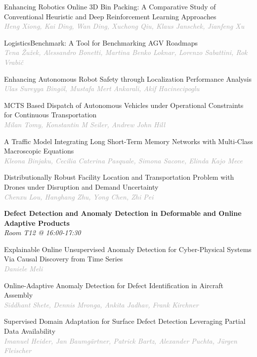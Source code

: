 \begin{multicols*}{2}
\small Enhancing Robotics Online 3D Bin Packing: A Comparative Study of Conventional Heuristic and Deep Reinforcement Learning Approaches\\ 
\footnotesize \textcolor{darkgray}{\textit{Heng Xiong, Kai  Ding, Wan  Ding, Xuchong  Qiu, Klaus  Janschek, Jianfeng  Xu}}

\small LogisticsBenchmark: A Tool for Benchmarking AGV Roadmaps\\ 
\footnotesize \textcolor{darkgray}{\textit{Tena Žužek, Alessandro  Bonetti, Martina  Benko Loknar, Lorenzo  Sabattini, Rok Vrabič}}

\small Enhancing Autonomous Robot Safety through Localization Performance Analysis\\ 
\footnotesize \textcolor{darkgray}{\textit{Ulas Sureyya Bingöl, Mustafa Mert  Ankarali, Akif  Hacinecipoglu}}

\small MCTS Based Dispatch of Autonomous Vehicles under Operational Constraints for Continuous Transportation\\ 
\footnotesize \textcolor{darkgray}{\textit{Milan Tomy, Konstantin M  Seiler, Andrew John  Hill}}

\small A Traffic Model Integrating Long Short-Term Memory Networks with Multi-Class Macroscopic Equations\\ 
\footnotesize \textcolor{darkgray}{\textit{Kleona Binjaku, Cecilia Caterina  Pasquale, Simona  Sacone, Elinda  Kajo Mece}}

\small Distributionally Robust Facility Location and Transportation Problem with Drones under Disruption and Demand Uncertainty\\ 
\footnotesize \textcolor{darkgray}{\textit{Chenxu Lou, Hanghang  Zhu, Yong  Chen, Zhi  Pei}}

\normalsize \textbf{Defect Detection and Anomaly Detection in Deformable and Online Adaptive Products}\\
\small \textit{Room T12 @ 16:00-17:30}

\small Explainable Online Unsupervised Anomaly Detection for Cyber-Physical Systems Via Causal Discovery from Time Series\\ 
\footnotesize \textcolor{darkgray}{\textit{Daniele Meli}}

\small Online-Adaptive Anomaly Detection for Defect Identification in Aircraft Assembly\\ 
\footnotesize \textcolor{darkgray}{\textit{Siddhant Shete, Dennis  Mronga, Ankita  Jadhav, Frank  Kirchner}}

\small Supervised Domain Adaptation for Surface Defect Detection Leveraging Partial Data Availability\\ 
\footnotesize \textcolor{darkgray}{\textit{Imanuel Heider, Jan  Baumgärtner, Patrick  Bartz, Alexander  Puchta, Jürgen  Fleischer}}


\end{multicols*}
